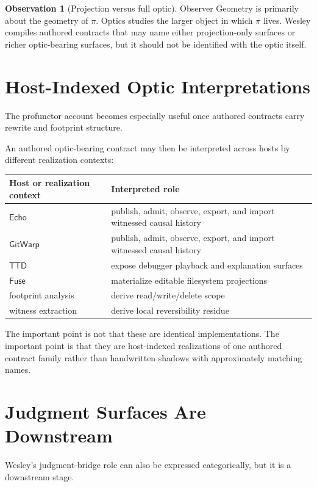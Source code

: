 \documentclass[11pt]{article}
\newcommand{\TTD}{\ensuremath{\mathsf{TTD}}}
\newcommand{\Echo}{\ensuremath{\mathsf{Echo}}}
\newcommand{\GitWarp}{\ensuremath{\mathsf{GitWarp}}}
\newcommand{\Fuse}{\ensuremath{\mathsf{Fuse}}}
\theoremstyle{definition}
\newtheorem{observation}{Observation}
\begin{document}
\begin{observation}[Projection versus full optic]
Observer Geometry is primarily about the geometry of $\pi$.
Optics studies the larger object in which $\pi$ lives.
Wesley compiles authored contracts that may name either projection-only
surfaces or richer optic-bearing surfaces, but it should not be identified
with the optic itself.
\end{observation}

\section{Host-Indexed Optic Interpretations}

The profunctor account becomes especially useful once authored contracts carry
rewrite and footprint structure.

An authored optic-bearing contract may then be interpreted across hosts by
different realization contexts:
\begin{center}
\begin{tabular}{@{}ll@{}}
\toprule
Host or realization context & Interpreted role \\
\midrule
\Echo{} & publish, admit, observe, export, and import witnessed causal history \\
\GitWarp{} & publish, admit, observe, export, and import witnessed causal history \\
\TTD{} & expose debugger playback and explanation surfaces \\
\Fuse{} & materialize editable filesystem projections \\
footprint analysis & derive read/write/delete scope \\
witness extraction & derive local reversibility residue \\
\bottomrule
\end{tabular}
\end{center}

The important point is not that these are identical implementations. The
important point is that they are host-indexed realizations of one authored
contract family rather than handwritten shadows with approximately matching
names.

\section{Judgment Surfaces Are Downstream}

Wesley's judgment-bridge role can also be expressed categorically, but it is a
downstream stage.
\end{document}
